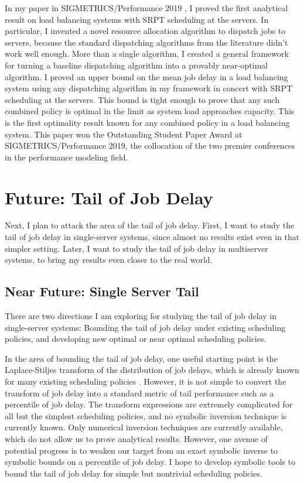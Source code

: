 \documentclass[11pt]{article}
\begin{document}
In my paper in SIGMETRICS/Performance 2019 \cite{Grosof:2019:LBG:3341617.3326157},
I proved the first analytical result on load balancing systems with SRPT scheduling at the servers.
In particular, I invented a novel resource allocation algorithm to dispatch jobs to servers,
because the standard dispatching algorithms from the literature didn’t work well enough.
More than a single algorithm,
I created a general framework for turning a baseline dispatching algorithm
into a provably near-optimal algorithm.
I proved an upper bound on the mean job delay
in a load balancing system using any dispatching algorithm in my framework
in concert with SRPT scheduling at the servers.
This bound is tight enough to prove that any such combined policy
is optimal in the limit as system load approaches capacity.
This is the first optimality result known for any combined policy in a load balancing system.
This paper won the Outstanding Student Paper Award at SIGMETRICS/Performance 2019,
the collocation of the two premier conferences in the performance modeling field.

\section{Future: Tail of Job Delay}
Next, I plan to attack the area of the tail of job delay.
First, I want to study the tail of job delay in single-server systems,
since almost no results exist even in that simpler setting.
Later, I want to study the tail of job delay in multiserver systems,
to bring my results even closer to the real world.

\subsection{Near Future: Single Server Tail}
There are two directions I am exploring for studying the tail of job delay in single-server systems: Bounding the tail of job delay under existing scheduling policies, and developing new optimal or near optimal scheduling policies.

In the area of bounding the tail of job delay,
one useful starting point is the Laplace-Stiljes transform
of the distribution of job delays,
which is already known for many existing scheduling policies \cite{Scully:2018:SOC:3203302.3179419}.
However, it is not simple to convert the transform of job delay
into a standard metric of tail performance such as a percentile of job delay.
The transform expressions are extremely complicated for all but the simplest scheduling policies,
and no symbolic inversion technique is currently known.
Only numerical inversion techniques are currently available,
which do not allow us to prove analytical results.
However, one avenue of potential progress is to weaken our target
from an exact symbolic inverse to symbolic bounds on a percentile of job delay.
I hope to develop symbolic tools to bound the tail of job delay
for simple but nontrivial scheduling policies.
\end{document}
